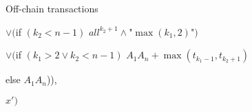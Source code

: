 \begin{notitlebox}{Off-chain transactions}
\begin{itemize}
\begin{itemize}
\begin{itemize}
        $\vee ($if $(k_2 < n - 1)$ $\mathit{all}^{k_2+1} \wedge
        \texttt{"}\max{(k_1, 2)}\texttt{"})$

        $\vee ($if $(k_1 > 2 \vee k_2 < n-1)$ $A_1 A_n+\max{(t_{k_1-1},
        t_{k_2+1})}$

        \:\:\: else $A_1 A_n$)),

        $x')$
      \end{itemize}
    \end{itemize}
  \end{itemize}
\end{notitlebox}
